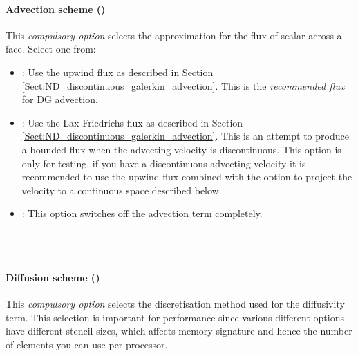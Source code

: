 \paragraph{Advection scheme ()} This
\emph{compulsory option} selects the approximation for the flux of
scalar across a face. Select one from:
\begin{itemize}
\item {}: Use the upwind flux as described in Section
  \ref{Sect:ND_discontinuous_galerkin_advection}. This is the
  \emph{recommended flux} for DG advection.
\item {}: Use the Lax-Friedrichs flux as described in
  Section \ref{Sect:ND_discontinuous_galerkin_advection}. This is an
  attempt to produce a bounded flux when the advecting velocity is
  discontinuous. This option is only for testing, if you have a
  discontinuous advecting velocity it is recommended to use the upwind
  flux combined with the option to project the velocity to a
  continuous space described below.
\item {}: This option switches off the advection term completely.
\end{itemize}

 \\
 \\

\paragraph{Diffusion scheme ()} 
This \emph{compulsory option} selects the discretisation method used
for the diffusivity term. This selection is important for performance
since various different options have different stencil sizes, which
affects memory signature and hence the number of elements you can use
per processor.

